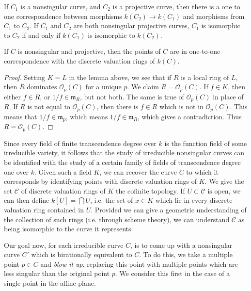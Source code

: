 \begin{corollary}
    If $C_1$ is a nonsingular curve, and $C_2$ is a projective curve, then there is a one to one correspondence between morphisms $k(C_2) \to k(C_1)$ and morphisms from $C_1$ to $C_2$. If $C_1$ and $C_2$ are both nonsingular projective curves, $C_1$ is isomorphic to $C_2$ if and only if $k(C_1)$ is isomorphic to $k(C_2)$.
\end{corollary}

\begin{corollary}
    If $C$ is nonsingular and projective, then the points of $C$ are in one-to-one correspondence with the discrete valuation rings of $k(C)$.
\end{corollary}
\begin{proof}
    Setting $K = L$ in the lemma above, we see that if $R$ is a local ring of $L$, then $R$ dominates $\mathcal{O}_p(C)$ for a unique $p$. We claim $R = \mathcal{O}_p(C)$. If $f \in K$, then either $f \in R$, or $1/f \in \mathfrak{m}_R$, but not both. The same is true of $\mathcal{O}_p(C)$ in place of $R$. If $R$ is not equal to $\mathcal{O}_p(C)$, then there is $f \in R$ which is not in $\mathcal{O}_p(C)$. This means that $1/f \in \mathfrak{m}_p$, which means $1/f \in \mathfrak{m}_R$, which gives a contradiction. Thus $R = \mathcal{O}_p(C)$.
\end{proof}

Since every field of finite transcendence degree over $k$ is the function field of some irreducible variety, it follows that the study of irreducible nonsingular curves can be identified with the study of a certain family of fields of transcendence degree one over $k$. Given such a field $K$, we can recover the curve $C$ to which it corresponds by identifying points with discrete valuation rings of $K$. We give the set $\mathcal{C}$ of discrete valuation rings of $K$ the cofinite topology. If $U \subset \mathcal{C}$ is open, we can then define $k[U] = \bigcap U$, i.e. the set of $x \in K$ which lie in every discrete valuation ring contained in $U$. Provided we can give a geometric understanding of the collection of such rings (i.e. through scheme theory), we can understand $\mathcal{C}$ as being isomorphic to the curve it represents.

Our goal now, for each irreducible curve $C$, is to come up with a nonsingular curve $C'$ which is birationally equivalent to $C$. To do this, we take a multiple point $p \in C$ and \emph{blow it up}, replacing this point with multiple points which are less singular than the original point $p$. We consider this first in the case of a single point in the affine plane.

